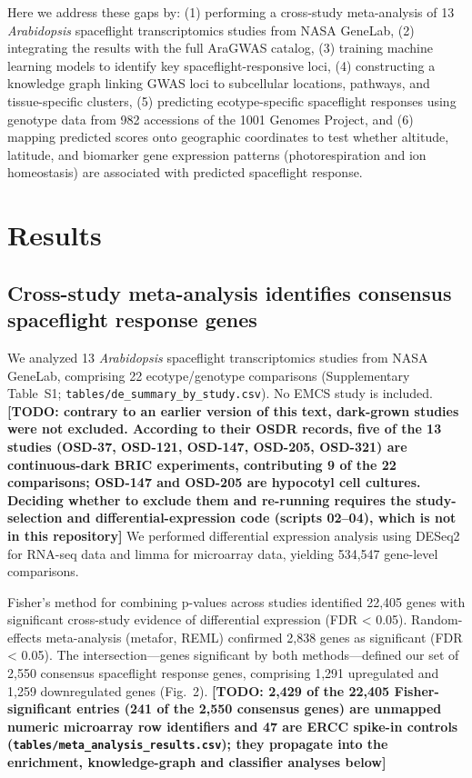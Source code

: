 \documentclass[sn-mathphys-num,Basic]{sn-jnl}
\begin{document}
Here we address these gaps by: (1) performing a cross-study meta-analysis of 13 \textit{Arabidopsis} spaceflight transcriptomics studies from NASA GeneLab, (2) integrating the results with the full AraGWAS catalog, (3) training machine learning models to identify key spaceflight-responsive loci, (4) constructing a knowledge graph linking GWAS loci to subcellular locations, pathways, and tissue-specific clusters, (5) predicting ecotype-specific spaceflight responses using genotype data from 982 accessions of the 1001 Genomes Project, and (6) mapping predicted scores onto geographic coordinates to test whether altitude, latitude, and biomarker gene expression patterns (photorespiration and ion homeostasis) are associated with predicted spaceflight response.

\section{Results}

\subsection{Cross-study meta-analysis identifies consensus spaceflight response genes}

We analyzed 13 \textit{Arabidopsis} spaceflight transcriptomics studies from NASA GeneLab, comprising 22 ecotype/genotype comparisons (Supplementary Table~S1; \texttt{tables/de\_summary\_by\_study.csv}). No EMCS study is included. \textbf{[TODO: contrary to an earlier version of this text, dark-grown studies were not excluded. According to their OSDR records, five of the 13 studies (OSD-37, OSD-121, OSD-147, OSD-205, OSD-321) are continuous-dark BRIC experiments, contributing 9 of the 22 comparisons; OSD-147 and OSD-205 are hypocotyl cell cultures. Deciding whether to exclude them and re-running requires the study-selection and differential-expression code (scripts 02--04), which is not in this repository]} We performed differential expression analysis using DESeq2 for RNA-seq data and limma for microarray data, yielding 534,547 gene-level comparisons.

Fisher's method for combining p-values across studies identified 22,405 genes with significant cross-study evidence of differential expression (FDR < 0.05). Random-effects meta-analysis (metafor, REML) confirmed 2,838 genes as significant (FDR < 0.05). The intersection---genes significant by both methods---defined our set of 2,550 consensus spaceflight response genes, comprising 1,291 upregulated and 1,259 downregulated genes (Fig.~2). \textbf{[TODO: 2,429 of the 22,405 Fisher-significant entries (241 of the 2,550 consensus genes) are unmapped numeric microarray row identifiers and 47 are ERCC spike-in controls (\texttt{tables/meta\_analysis\_results.csv}); they propagate into the enrichment, knowledge-graph and classifier analyses below]}
\end{document}
